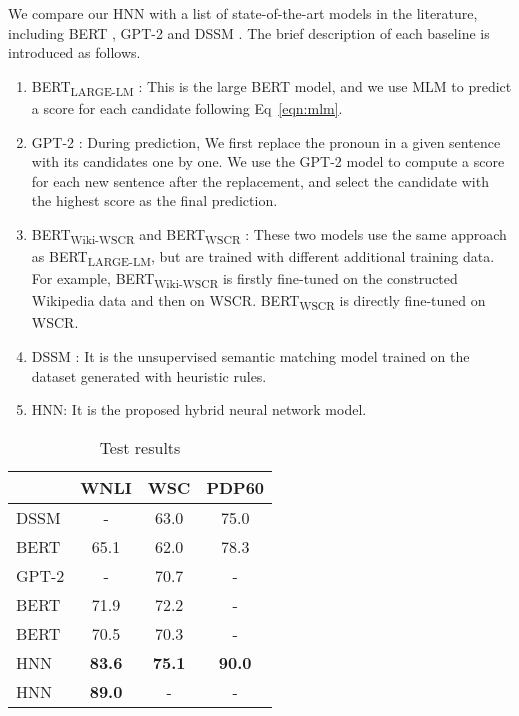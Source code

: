 \documentclass[11pt,a4paper]{article}
\newcommand{\nmodel}{HNN}
\newcommand{\wsc}{WSC}
\begin{document}
We compare our {\nmodel} with a list of state-of-the-art models in the literature, including BERT \cite{bert2018}, GPT-2 \cite{radford2019language} and DSSM \cite{wang-etal-2019-unsupervised}. The brief description of each baseline is introduced as follows.
\begin{enumerate}
    \item BERT\textsubscript{LARGE-LM} \cite{bert2018}: This is the large BERT model, and we use MLM to predict a score for each candidate following Eq~\ref{eqn:mlm}.
    \item GPT-2 \cite{radford2019language}: During prediction, We first replace the pronoun in a given sentence with its candidates one by one.  We use the GPT-2 model to compute a score for each new sentence after the replacement, and select the candidate with the highest score as the final prediction. 
   \item BERT\textsubscript{Wiki-WSCR} and BERT\textsubscript{WSCR} \cite{kocijan2019surprisingly}: These two models use the same approach as BERT\textsubscript{LARGE-LM}, but are trained with different additional training data. For example, BERT\textsubscript{Wiki-WSCR} is firstly fine-tuned on the constructed Wikipedia data and then on WSCR. 
   BERT\textsubscript{WSCR} is directly fine-tuned on WSCR.
  \item{DSSM} \cite{wang-etal-2019-unsupervised}: It is the unsupervised semantic matching model trained on the dataset generated with heuristic rules.
  \item {\nmodel}: It is the proposed hybrid neural network model.
\end{enumerate}
\begin{table*}[htb!]
	\begin{center}
		\begin{tabular}{l |c c c} \hline
			 &WNLI & {\wsc}  & PDP60 \\ \hline \hline
			DSSM \cite{wang-etal-2019-unsupervised}    &- &63.0 & 75.0 \\  \hline \hline
            
			BERT \cite{devlin2018bert}& 65.1 &62.0  &78.3\\ \hline
			GPT-2 \cite{radford2019language}   &- &70.7 & - \\ \hline
            BERT \cite{kocijan2019surprisingly} &71.9 &72.2 & - \\ \hline	   
            BERT \cite{kocijan2019surprisingly} &70.5 &70.3 & - \\	    \hline \hline 
            {\nmodel} &\bf 83.6 & \bf 75.1 &  \bf 90.0\\\hline 
            {\nmodel} &\bf 89.0 & - &  - \\\hline
\end{tabular}
	\end{center}
    \caption{Test results}
	\label{tab:test}
\end{table*}
\end{document}
